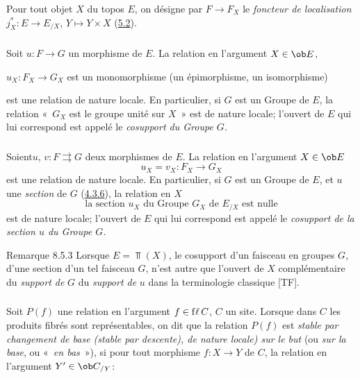 \documentclass[10pt]{../fichiers-configuration-latex/smfart}
\begin{document}
Pour tout objet $X$ du topos $E$, on désigne par $F\rightarrow F_X$
le \emph{foncteur de localisation} $j^{\ast}_X:E\rightarrow
E_{/X}$, $Y\mapsto Y\times X$ (\hyperref[IV.subsec5.2]{5.2}).

\subsubsection{}
Soit $u:F\rightarrow G$ un morphisme de $E$. La relation en
l'argument $X\in \ob E$,

$u_X:F_X\rightarrow G_X$ est un monomorphisme (\resp un
épimorphisme, \resp un isomorphisme)

\noindent est une relation de nature locale. En particulier, si $G$
est un Groupe de $E$, la relation « $G_X$ est le groupe unité sur
$X$ » est de nature locale; l'ouvert de $E$ qui lui correspond est
appelé le \emph{cosupport du Groupe $G$.}

\subsubsection{}
Soient\pageoriginale $u$, $v:F\rightrightarrows G$ deux morphismes
de $E$. La relation en l'argument $X\in \ob E$
$$
u_X=v_X:F_X\longrightarrow G_X
$$
est une relation de nature locale. En particulier, si $G$ est un
Groupe de $E$, et $u$ une \emph{section} de $G$
(\hyperref[IV.subsubsec4.3.6]{4.3.6}), la relation en $X$
$$
\mbox{la section $u_X$ du Groupe $G_X$ de $E_{/X}$ est nulle}
$$
est de nature locale; l'ouvert de $E$ qui lui correspond est appelé
le \emph{cosupport de la section $u$ du Groupe $G$.}

\begin{enonce*}[remark]{Remarque 8.5.3}
Lorsque $E=\Top(X)$, le cosupport d'un faisceau en groupes $G$,
\resp d'une section d'un tel faisceau $G$, n'est autre que l'ouvert
de $X$ complémentaire du \emph{support de} $G$ \resp du
\emph{support de} $u$ dans la terminologie classique [TF].
\end{enonce*}

\setcounter{subsubsection}{3}
\subsubsection{}
Soit $P(f)$ une relation en l'argument $f\in {\rm f\ell\,} C$, $C$
un site. Lorsque dans $C$ les produits fibrés sont représentables,
on dit que la relation $P(f)$ est \emph{stable par changement de
base (\resp stable par descente), \resp de nature locale) sur le
but} (ou \emph{sur la base}, ou « \emph{en bas} »), si pour tout
morphisme $f:X\rightarrow Y$ de $C$, la relation en l'argument
$Y'\in \ob C_{/Y}$:
\end{document}
